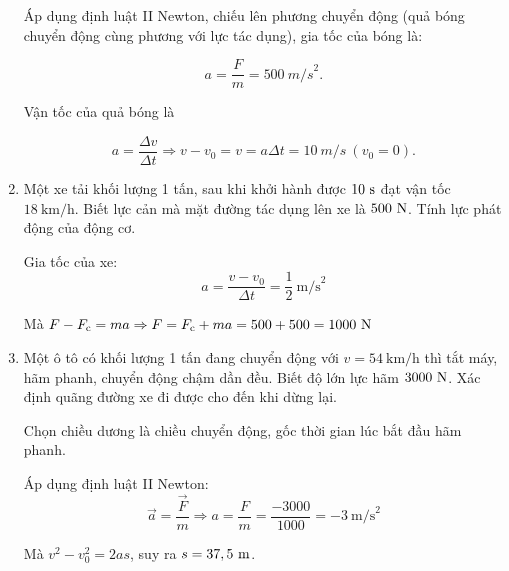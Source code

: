 \begin{enumerate}[label=\bfseries Câu \arabic*:]
{		Áp dụng định luật II Newton, chiếu lên phương chuyển động (quả bóng chuyển động cùng phương với lực tác dụng), gia tốc của bóng là:
		
		$$a = \dfrac{F}{m} = \SI{500}{m/s}^2.$$
		
		Vận tốc của quả bóng là
		
		$$a = \dfrac{\Delta v}{\Delta t} \Rightarrow v - v_0 = v = a \Delta t = \SI{10}{m/s}\ (v_0 = 0).$$
		
		
	}
	\item {}
	
	
	{Một xe tải khối lượng 1 tấn, sau khi khởi hành được $10\ \text s$ đạt vận tốc $18\ \text{km/h}$. Biết lực cản mà mặt đường tác dụng lên xe là $500\ \text N$. Tính lực phát động của động cơ.
	}
	
	\hideall
	{	Gia tốc của xe:
		\[a = \dfrac{v-v_0}{\Delta t} = \dfrac{1}{2}\ \text{m/s}^2\]
		
		Mà $F-F_\text c = ma \Rightarrow F = F_\text c + ma = 500 + 500 = 1000\ \text N$
	}
	\item {}
	
	
	{Một ô tô có khối lượng 1 tấn đang chuyển động với $v=54\ \text{km/h}$ thì tắt máy, hãm phanh, chuyển động chậm dần đều. Biết độ lớn lực hãm $3000\ \text N$. Xác định quãng đường xe đi được cho đến khi dừng lại.
	}
	
	\hideall
	{Chọn chiều dương là chiều chuyển động, gốc thời gian lúc bắt đầu hãm phanh.
		
		Áp dụng định luật II Newton:
		\[ \vec a = \dfrac {\vec F}{m} \Rightarrow a=\dfrac{F}{m} = \dfrac{-3000}{1000} = -3\ \text{m/s}^2\]
		
		Mà $v^2 - v_0 ^2 = 2as$, suy ra $s=37,5\ \text m$.
	}

\end{enumerate}